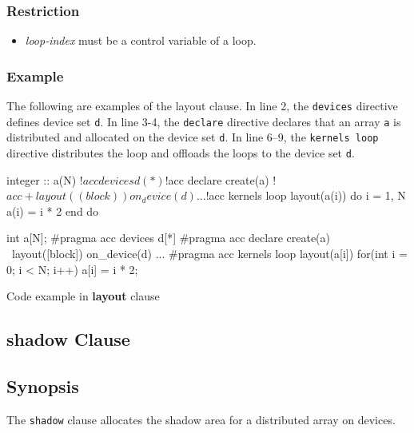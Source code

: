 \subsubsection*{Restriction}
\begin{itemize}
\item {\it loop-index} must be a control variable of a loop. %
\end{itemize}

\subsubsection*{Example}
The following are examples of the layout clause.
In line 2, the {\tt devices} directive defines device set {\tt d}.
In line 3-4, the {\tt declare} directive declares that an array {\tt a} is distributed and allocated on the device set {\tt d}.
In line 6--9, the {\tt kernels loop} directive distributes the loop and offloads the loops to the device set {\tt d}.
%
\begin{myfigure}
\begin{minipage}{0.47\hsize}
\begin{center}
\begin{XACCFexampleL}
integer :: a(N)
!$acc devices d(*)
!$acc declare create(a)
!$acc+layout((block)) on_device(d)
...
!$acc kernels loop layout(a(i))
do i = 1, N
  a(i) = i * 2
end do
\end{XACCFexampleL}
\end{center}
\end{minipage}
%
\begin{minipage}{0.48\hsize}
\begin{center}
\begin{XACCCexampleR}
int a[N];
#pragma acc devices d[*]
#pragma acc declare create(a) \
        layout([block]) on_device(d)
...
#pragma acc kernels loop layout(a[i])
for(int i = 0; i < N; i++){
  a[i] = i * 2;
}
\end{XACCCexampleR}
\end{center}
\end{minipage}
\caption{Code example in {\XACC} {\bf layout} clause}\label{code:layout_clause}
\end{myfigure}


\subsection{shadow Clause}
\subsection*{Synopsis}
The {\tt shadow} clause allocates the shadow area for a distributed array on devices.

